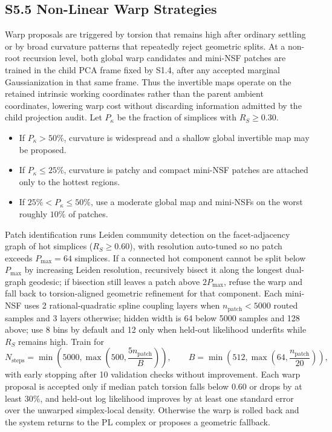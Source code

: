 \documentclass[11pt]{article}
\begin{document}
\subsection*{S5.5 Non-Linear Warp Strategies}
Warp proposals are triggered by torsion that remains high after ordinary settling or by broad curvature patterns that repeatedly reject geometric splits. At a non-root recursion level, both global warp candidates and mini-NSF patches are trained in the child PCA frame fixed by S1.4, after any accepted marginal Gaussianization in that same frame. Thus the invertible maps operate on the retained intrinsic working coordinates rather than the parent ambient coordinates, lowering warp cost without discarding information admitted by the child projection audit. Let $P_\kappa$ be the fraction of simplices with $R_S\ge0.30$.
\begin{itemize}[leftmargin=1.5em]
  \item If $P_\kappa>50\%$, curvature is widespread and a shallow global invertible map may be proposed.
  \item If $P_\kappa\le25\%$, curvature is patchy and compact mini-NSF patches are attached only to the hottest regions.
  \item If $25\%<P_\kappa\le50\%$, use a moderate global map and mini-NSFs on the worst roughly $10\%$ of patches.
\end{itemize}
Patch identification runs Leiden community detection on the facet-adjacency graph of hot simplices ($R_S\ge0.60$), with resolution auto-tuned so no patch exceeds $P_{\max}=64$ simplices. If a connected hot component cannot be split below $P_{\max}$ by increasing Leiden resolution, recursively bisect it along the longest dual-graph geodesic; if bisection still leaves a patch above $2P_{\max}$, refuse the warp and fall back to torsion-aligned geometric refinement for that component. Each mini-NSF uses 2 rational-quadratic spline coupling layers when $n_{\mathrm{patch}}<5000$ routed samples and 3 layers otherwise; hidden width is 64 below 5000 samples and 128 above; use 8 bins by default and 12 only when held-out likelihood underfits while $R_S$ remains high. Train for
\[
N_{\mathrm{steps}}
=
\min\!\left(5000,\max\!\left(500,\frac{5n_{\mathrm{patch}}}{B}\right)\right),
\qquad
B=\min\!\left(512,\max\!\left(64,\frac{n_{\mathrm{patch}}}{20}\right)\right),
\]
with early stopping after 10 validation checks without improvement. Each warp proposal is accepted only if median patch torsion falls below $0.60$ or drops by at least $30\%$, and held-out log likelihood improves by at least one standard error over the unwarped simplex-local density. Otherwise the warp is rolled back and the system returns to the PL complex or proposes a geometric fallback.
\end{document}
